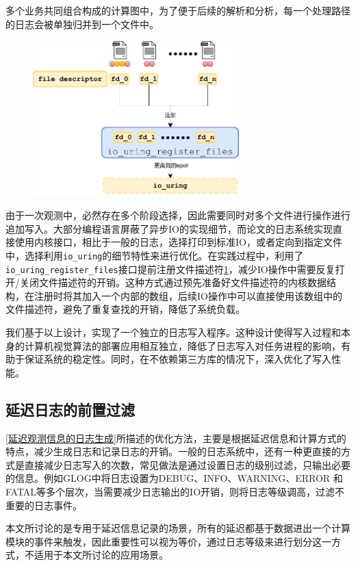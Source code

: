 \documentclass[master]{shtthesis}
\begin{document}
多个业务共同组合构成的计算图中，为了便于后续的解析和分析，每一个处理路径的日志会被单独归并到一个文件中。
\begin{figure}[htbp]
	\centering
	\includegraphics[width=8cm]{img/reg.pdf}
	\label{延迟日志写入优化}
\end{figure}
由于一次观测中，必然存在多个阶段选择，因此需要同时对多个文件进行操作进行追加写入。大部分编程语言屏蔽了异步IO的实现细节，而论文的日志系统实现直接使用内核接口，相比于一般的日志，选择打印到标准IO，或者定向到指定文件中，选择利用\verb*|io_uring|的细节特性来进行优化。在实践过程中，利用了\verb*|io_uring_register_files|接口提前注册文件描述符\ref{延迟日志写入优化}，减少IO操作中需要反复打开/关闭文件描述符的开销。这种方式通过预先准备好文件描述符的内核数据结构，在注册时将其加入一个内部的数组，后续IO操作中可以直接使用该数组中的文件描述符，避免了重复查找的开销，降低了系统负载。

我们基于以上设计，实现了一个独立的日志写入程序。这种设计使得写入过程和本身的计算机视觉算法的部署应用相互独立，降低了日志写入对任务进程的影响，有助于保证系统的稳定性。同时，在不依赖第三方库的情况下，深入优化了写入性能。

\subsection{延迟日志的前置过滤}
\ref{延迟观测信息的日志生成}所描述的优化方法，主要是根据延迟信息和计算方式的特点，减少生成日志和记录日志的开销。一般的日志系统中，还有一种更直接的方式是直接减少日志写入的次数，常见做法是通过设置日志的级别过滤，只输出必要的信息。例如GLOG中将日志设置为DEBUG、INFO、WARNING、ERROR 和 FATAL等多个层次，当需要减少日志输出的IO开销，则将日志等级调高，过滤不重要的日志事件。

本文所讨论的是专用于延迟信息记录的场景，所有的延迟都基于数据进出一个计算模块的事件来触发，因此重要性可以视为等价，通过日志等级来进行划分这一方式，不适用于本文所讨论的应用场景。
\end{document}
